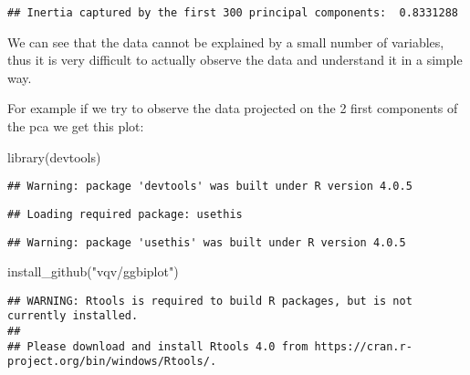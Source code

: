 \documentclass[
]{article}
\newenvironment{Shaded}{\begin{snugshade}}{\end{snugshade}}
\newcommand{\DecValTok}[1]{\textcolor[rgb]{0.00,0.00,0.81}{#1}}
\newcommand{\FunctionTok}[1]{\textcolor[rgb]{0.00,0.00,0.00}{#1}}
\newcommand{\NormalTok}[1]{#1}
\newcommand{\OtherTok}[1]{\textcolor[rgb]{0.56,0.35,0.01}{#1}}
\newcommand{\SpecialCharTok}[1]{\textcolor[rgb]{0.00,0.00,0.00}{#1}}
\newcommand{\StringTok}[1]{\textcolor[rgb]{0.31,0.60,0.02}{#1}}
\begin{document}
\begin{Shaded}
\end{Shaded}

\begin{verbatim}
## Inertia captured by the first 300 principal components:  0.8331288
\end{verbatim}

We can see that the data cannot be explained by a small number of
variables, thus it is very difficult to actually observe the data and
understand it in a simple way.

For example if we try to observe the data projected on the 2 first
components of the pca we get this plot:

\begin{Shaded}
\begin{Highlighting}[]
\FunctionTok{library}\NormalTok{(devtools)}
\end{Highlighting}
\end{Shaded}

\begin{verbatim}
## Warning: package 'devtools' was built under R version 4.0.5
\end{verbatim}

\begin{verbatim}
## Loading required package: usethis
\end{verbatim}

\begin{verbatim}
## Warning: package 'usethis' was built under R version 4.0.5
\end{verbatim}

\begin{Shaded}
\begin{Highlighting}[]
\FunctionTok{install\_github}\NormalTok{(}\StringTok{"vqv/ggbiplot"}\NormalTok{)}
\end{Highlighting}
\end{Shaded}

\begin{verbatim}
## WARNING: Rtools is required to build R packages, but is not currently installed.
## 
## Please download and install Rtools 4.0 from https://cran.r-project.org/bin/windows/Rtools/.
\end{verbatim}
\end{document}
